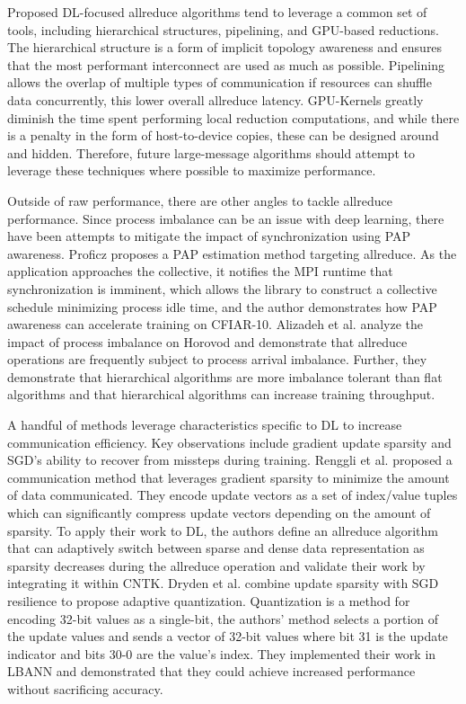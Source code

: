 Proposed DL-focused allreduce algorithms tend to leverage a common set of tools, including hierarchical structures, pipelining, and GPU-based reductions.
The hierarchical structure is a form of implicit topology awareness and ensures that the most performant interconnect are used as much as possible.
Pipelining allows the overlap of multiple types of communication if resources can shuffle data concurrently, this lower overall allreduce latency. 
GPU-Kernels greatly diminish the time spent performing local reduction computations, and while there is a penalty in the form of host-to-device copies, these can be designed around and hidden.
Therefore, future large-message algorithms should attempt to leverage these techniques where possible to maximize performance. 

Outside of raw performance, there are other angles to tackle allreduce performance.
Since process imbalance can be an issue with deep learning, there have been attempts to mitigate the impact of synchronization using PAP awareness.
Proficz proposes a PAP estimation method \cite{Proficz2018ImprvAllReduceForImbPAP} targeting allreduce.
As the application approaches the collective, it notifies the MPI runtime that synchronization is imminent, which allows the library to construct a collective schedule minimizing process idle time, and the author demonstrates how PAP awareness can accelerate training on CFIAR-10.
Alizadeh et al. \cite{Alizadeh2022PAPCollDL} analyze the impact of process imbalance on Horovod and demonstrate that allreduce operations are frequently subject to process arrival imbalance. 
Further, they demonstrate that hierarchical algorithms are more imbalance tolerant than flat algorithms and that hierarchical algorithms can increase training throughput.

A handful of methods leverage characteristics specific to DL to increase communication efficiency.
Key observations include gradient update sparsity and SGD's ability to recover from missteps during training.
Renggli et al. \cite{Renggli2019SparCML} proposed a communication method that leverages gradient sparsity to minimize the amount of data communicated.
They encode update vectors as a set of index/value tuples which can significantly compress update vectors depending on the amount of sparsity.
To apply their work to DL, the authors define an allreduce algorithm that can adaptively switch between sparse and dense data representation as sparsity decreases during the allreduce operation and validate their work by integrating it within CNTK.
Dryden et al. \cite{Dryden2016CommQuantDPDNN} combine update sparsity with SGD resilience to propose adaptive quantization. 
Quantization is a method for encoding 32-bit values as a single-bit, the authors' method selects a portion of the update values and sends a vector of 32-bit values where bit 31 is the update indicator and bits 30-0 are the value's index.
They implemented their work in LBANN and demonstrated that they could achieve increased performance without sacrificing accuracy.


